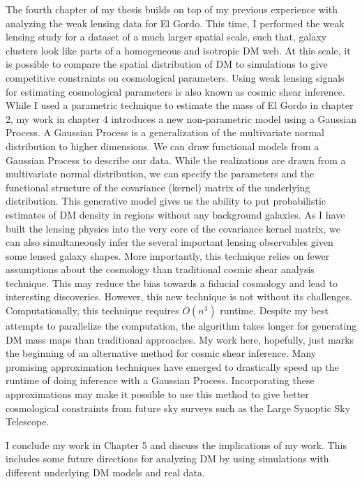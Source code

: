 \documentclass[ucdthesis.tex]{subfiles}
\begin{document}
			The fourth chapter of my thesis builds on top of my previous experience
			with analyzing the weak lensing data for El Gordo. This time, I performed 
			the weak lensing study for a dataset of a much larger spatial scale, 
			such that, galaxy
		clusters look like parts of a homogeneous and isotropic DM web. At this scale,
		it is possible to compare the spatial distribution of DM to simulations to give 
		competitive constraints on cosmological parameters. Using weak lensing
		signals for estimating cosmological parameters is also known as cosmic shear 
		inference. While I used a parametric technique to estimate the mass of El
		Gordo in chapter 2, 
		my work in chapter 4 introduces a new non-parametric model using a Gaussian Process.
		A Gaussian Process is a generalization of the multivariate normal distribution 
		to higher dimensions. We can draw functional models from a Gaussian Process
		to describe our data. While the realizations are drawn from a multivariate
		normal distribution,  we can specify the parameters and the
		functional structure of the covariance (kernel) matrix of the underlying 
		distribution. 
		This generative model gives us the ability to put probabilistic estimates 
		of DM density in regions without any background galaxies. 
		As I have built the lensing physics into the 
		very core of the covariance kernel matrix, we can also simultaneously infer the
		several important lensing observables given some lensed galaxy shapes. 
		More importantly, this technique relies on fewer assumptions about the
		cosmology than traditional cosmic shear analysis technique. This may reduce
		the bias towards a fiducial cosmology and lead to interesting discoveries.
		However, this new technique is not without its challenges. Computationally,
		this technique requires $O(n^3)$ runtime. Despite my best attempts to
		parallelize the computation, the algorithm takes longer for
	  generating DM mass maps than traditional approaches. My work here,
		hopefully, just marks the beginning of an alternative method for cosmic
		shear inference. Many promising approximation techniques have emerged to 
		drastically speed up the runtime of doing inference with a Gaussian Process.
		Incorporating these approximations may make it possible to use this method 
		to give better cosmological constraints  
		from future sky surveys such as the Large Synoptic Sky Telescope.  

			I conclude my work in Chapter 5 and discuss the implications of my work.
			This includes some future directions for analyzing DM
			by using simulations with different underlying DM
			models and real data. 
\end{document}
